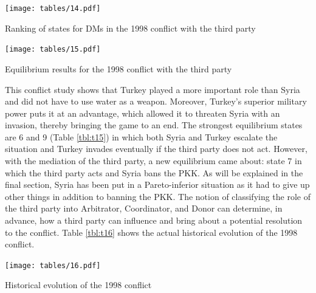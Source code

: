 \documentclass[letterpaper,12pt,titlepage,oneside,final]{book}
\begin{document}
\begin{table}[H]
\centering
\texttt{[image: tables/14.pdf]}

\caption{Ranking of states for DMs in the 1998 conflict with the third party}

\label{tbl:t14}
\end{table}

\begin{table}[H]
\centering
\texttt{[image: tables/15.pdf]}

\caption{Equilibrium results for the 1998 conflict with the third party}

\label{tbl:t15}
\end{table}

This conflict study shows that Turkey played a more important role than Syria and did not have to use water as a weapon. Moreover, Turkey's superior military power puts it at an advantage, which allowed it to threaten Syria with an invasion, thereby bringing the game to an end. The strongest equilibrium states are 6 and 9 (Table \ref{tbl:t15}) in which both Syria and Turkey escalate the situation and Turkey invades eventually if the third party does not act. However, with the mediation of the third party, a new equilibrium came about: state 7 in which the third party acts and Syria bans the PKK. As will be explained in the final section, Syria has been put in a Pareto-inferior situation as it had to give up other things in addition to banning the PKK.
The notion of classifying the role of the third party into Arbitrator, Coordinator, and Donor can determine, in advance, how a third party can influence and bring about a potential resolution to the conflict. Table \ref{tbl:t16} shows the actual historical evolution of the 1998 conflict. 


\begin{table}[H]
\centering
\texttt{[image: tables/16.pdf]}

\caption{Historical evolution of the 1998 conflict}

\label{tbl:t16}
\end{table}
\end{document}
